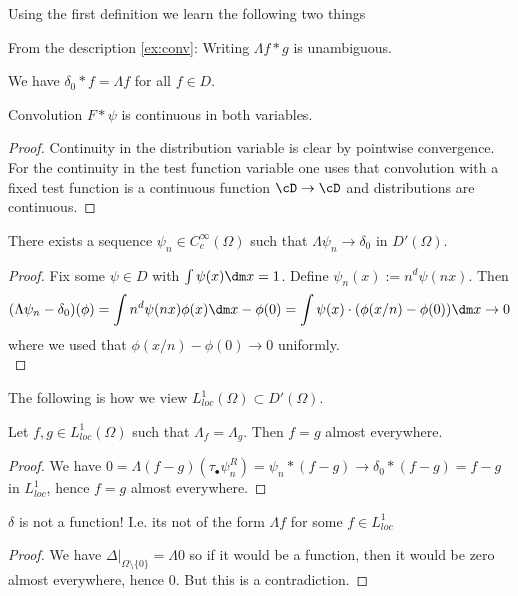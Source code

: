 Using the first definition we learn the following two things
\begin{example}
	From the description \ref{ex:conv}: Writing $\Lambda f * g$ is unambiguous.
\end{example}
\begin{example}
	We have $\delta_0 * f = \Lambda f$ for all $f \in D$.
\end{example}
\begin{lemma}{\label{lemma:cont}}
	Convolution $F * \psi$ is continuous in both variables.
\end{lemma}
\begin{proof}
	Continuity in the distribution variable is clear by pointwise convergence. \\
	For the continuity in the test function variable one uses that convolution with a fixed test function is a continuous function $\cD \to \cD$ and distributions are continuous.
\end{proof}
\begin{proposition}{\label{proposition:deltaInClosure}}
	There exists a sequence $\psi_n \in C_c^{\infty}(\Omega)$ such that $\Lambda \psi_n \to \delta_0$ in $D'(\Omega)$.
\end{proposition}
\begin{proof}
	Fix some $\psi \in D$ with $\int \psi(x) \dm x = 1$. Define $\psi_n (x) := n^d \psi(nx)$. Then
	\[
	(\Lambda \psi_n - \delta_0) (\phi )  = \int n^d \psi (n x) \phi(x) \dm x - \phi(0) = \int \psi (x) \cdot (\phi(x / n) - \phi(0)) \dm x \to 0
	\]
	where we used that $\phi(x/n) - \phi(0) \to 0$ uniformly. \\
\end{proof}
The following is how we view $L^1_{loc}(\Omega) \subset D'(\Omega)$.
\begin{corollary}
	Let $f,g \in L^1_{loc}(\Omega)$ such that $\Lambda_f = \Lambda_g$. Then $f = g$ almost everywhere.
\end{corollary}
\begin{proof}
	We have $0 = \Lambda(f-g)(\tau_{\bullet} \psi_n^R) = \psi_n * (f - g) \to \delta_0 * (f-g) = f-g$ in $L^1_{loc}$, hence $f = g$ almost everywhere.
\end{proof}
\begin{example}
	$\delta$ is not a function! I.e. its not of the form $\Lambda f$ for some $f \in L^1_{loc}$
\end{example}
\begin{proof}
	We have $\Delta|_{\Omega \setminus \{0\}}= \Lambda 0$ so if it would be a function, then it would be zero almost everywhere, hence 0. But this is a contradiction.
\end{proof}
